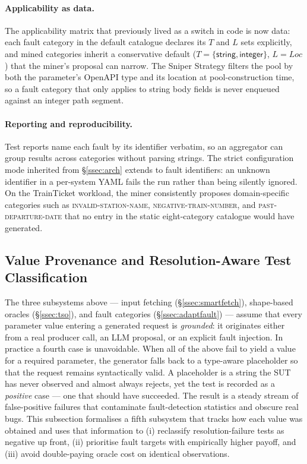 \documentclass[conference]{IEEEtran}
\begin{document}
\paragraph{Applicability as data.}
The applicability matrix that previously lived as a switch in code is now data: each fault category in the default catalogue declares its $T$ and $L$ sets explicitly, and mined categories inherit a conservative default ($T = \{\textsf{string}, \textsf{integer}\}$, $L = \mathit{Loc}$) that the miner's proposal can narrow. The Sniper Strategy filters the pool by both the parameter's OpenAPI type and its location at pool-construction time, so a fault category that only applies to string body fields is never enqueued against an integer path segment.

\paragraph{Reporting and reproducibility.}
Test reports name each fault by its identifier verbatim, so an aggregator can group results across categories without parsing strings. The strict configuration mode inherited from \S\ref{ssec:arch} extends to fault identifiers: an unknown identifier in a per-system YAML fails the run rather than being silently ignored. On the TrainTicket workload, the miner consistently proposes domain-specific categories such as \textsc{invalid-station-name}, \textsc{negative-train-number}, and \textsc{past-departure-date} that no entry in the static eight-category catalogue would have generated.

\subsection{Value Provenance and Resolution-Aware Test Classification}
\label{ssec:provenance}

The three subsystems above --- input fetching (\S\ref{ssec:smartfetch}), shape-based oracles (\S\ref{ssec:tso}), and fault categories (\S\ref{ssec:adaptfault}) --- assume that every parameter value entering a generated request is \emph{grounded}: it originates either from a real producer call, an LLM proposal, or an explicit fault injection. In practice a fourth case is unavoidable. When all of the above fail to yield a value for a required parameter, the generator falls back to a type-aware placeholder so that the request remains syntactically valid. A placeholder is a string the SUT has never observed and almost always rejects, yet the test is recorded as a \emph{positive} case --- one that should have succeeded. The result is a steady stream of false-positive failures that contaminate fault-detection statistics and obscure real bugs. This subsection formalises a fifth subsystem that tracks how each value was obtained and uses that information to (i) reclassify resolution-failure tests as negative up front, (ii) prioritise fault targets with empirically higher payoff, and (iii) avoid double-paying oracle cost on identical observations.
\end{document}
